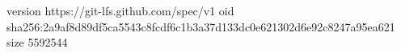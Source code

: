 version https://git-lfs.github.com/spec/v1
oid sha256:2a9af8d89df5ca5543c8fcdf6c1b3a37d133dc0e621302d6e92c8247a95ea621
size 5592544
